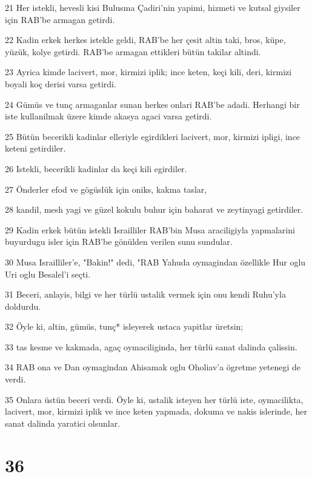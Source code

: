 \par 21 Her istekli, hevesli kisi Bulusma Çadiri'nin yapimi, hizmeti ve kutsal giysiler için RAB'be armagan getirdi.
\par 22 Kadin erkek herkes istekle geldi, RAB'be her çesit altin taki, bros, küpe, yüzük, kolye getirdi. RAB'be armagan ettikleri bütün takilar altindi.
\par 23 Ayrica kimde lacivert, mor, kirmizi iplik; ince keten, keçi kili, deri, kirmizi boyali koç derisi varsa getirdi.
\par 24 Gümüs ve tunç armaganlar sunan herkes onlari RAB'be adadi. Herhangi bir iste kullanilmak üzere kimde akasya agaci varsa getirdi.
\par 25 Bütün becerikli kadinlar elleriyle egirdikleri lacivert, mor, kirmizi ipligi, ince keteni getirdiler.
\par 26 Istekli, becerikli kadinlar da keçi kili egirdiler.
\par 27 Önderler efod ve gögüslük için oniks, kakma taslar,
\par 28 kandil, mesh yagi ve güzel kokulu buhur için baharat ve zeytinyagi getirdiler.
\par 29 Kadin erkek bütün istekli Israilliler RAB'bin Musa araciligiyla yapmalarini buyurdugu isler için RAB'be gönülden verilen sunu sundular.
\par 30 Musa Israilliler'e, "Bakin!" dedi, "RAB Yahuda oymagindan özellikle Hur oglu Uri oglu Besalel'i seçti.
\par 31 Beceri, anlayis, bilgi ve her türlü ustalik vermek için onu kendi Ruhu'yla doldurdu.
\par 32 Öyle ki, altin, gümüs, tunç* isleyerek ustaca yapitlar üretsin;
\par 33 tas kesme ve kakmada, agaç oymaciliginda, her türlü sanat dalinda çalissin.
\par 34 RAB ona ve Dan oymagindan Ahisamak oglu Oholiav'a ögretme yetenegi de verdi.
\par 35 Onlara üstün beceri verdi. Öyle ki, ustalik isteyen her türlü iste, oymacilikta, lacivert, mor, kirmizi iplik ve ince keten yapmada, dokuma ve nakis islerinde, her sanat dalinda yaratici olsunlar.

\chapter{36}

